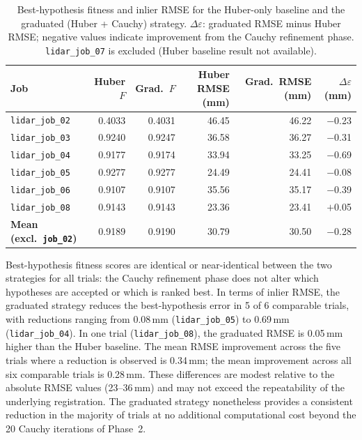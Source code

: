 \begin{table}[htbp]
  \centering
  \small
  \setlength{\tabcolsep}{4pt}
  \caption{Best-hypothesis fitness and inlier RMSE for the Huber-only baseline and the graduated (Huber + Cauchy) strategy. $\Delta\varepsilon$: graduated RMSE minus Huber RMSE; negative values indicate improvement from the Cauchy refinement phase. \texttt{lidar\_job\_07} is excluded (Huber baseline result not available).}
  \label{tab:pa-results-baseline}
  \begin{tabular}{@{} l r r r r r @{}}
    \toprule
    \textbf{Job} &
    \textbf{Huber $F$} &
    \textbf{Grad.\ $F$} &
    \textbf{Huber RMSE (mm)} &
    \textbf{Grad.\ RMSE (mm)} &
    \boldmath$\Delta\varepsilon$ \textbf{(mm)} \\
    \midrule
    \texttt{lidar\_job\_02} & 0.4033 & 0.4031 & 46.45 & 46.22 & $-$0.23 \\
    \texttt{lidar\_job\_03} & 0.9240 & 0.9247 & 36.58 & 36.27 & $-$0.31 \\
    \texttt{lidar\_job\_04} & 0.9177 & 0.9174 & 33.94 & 33.25 & $-$0.69 \\
    \texttt{lidar\_job\_05} & 0.9277 & 0.9277 & 24.49 & 24.41 & $-$0.08 \\
    \texttt{lidar\_job\_06} & 0.9107 & 0.9107 & 35.56 & 35.17 & $-$0.39 \\
    \texttt{lidar\_job\_08} & 0.9143 & 0.9143 & 23.36 & 23.41 & $+$0.05 \\
    \midrule
    \textbf{Mean (excl.\ \texttt{job\_02})} & 0.9189 & 0.9190 & 30.79 & 30.50 & $-$0.28 \\
    \bottomrule
  \end{tabular}
\end{table}

Best-hypothesis fitness scores are identical or near-identical between the two strategies for all trials: the Cauchy refinement phase does not alter which hypotheses are accepted or which is ranked best. In terms of inlier RMSE, the graduated strategy reduces the best-hypothesis error in 5 of 6 comparable trials, with reductions ranging from 0.08\,mm (\texttt{lidar\_job\_05}) to 0.69\,mm (\texttt{lidar\_job\_04}). In one trial (\texttt{lidar\_job\_08}), the graduated RMSE is 0.05\,mm higher than the Huber baseline. The mean RMSE improvement across the five trials where a reduction is observed is 0.34\,mm; the mean improvement across all six comparable trials is 0.28\,mm. These differences are modest relative to the absolute RMSE values (23--36\,mm) and may not exceed the repeatability of the underlying registration. The graduated strategy nonetheless provides a consistent reduction in the majority of trials at no additional computational cost beyond the 20 Cauchy iterations of Phase~2.

